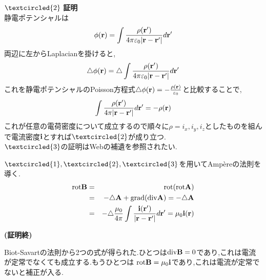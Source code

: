\documentclass{jsarticle}
\begin{document}
$\textcircled{\scriptsize2}$ {\bf 証明} \\
静電ポテンシャルは
\begin{eqnarray*}
\phi ({\bf r})= \int \frac{\rho({\bf r'})}{4 \pi \varepsilon_0 |{\bf r}-{\bf r'}|}d{\bf r'}
\end{eqnarray*}
両辺に左からLaplacianを掛けると,
\begin{eqnarray*}
\triangle \phi ({\bf r})= \triangle \int \frac{\rho({\bf r'})}{4 \pi \varepsilon_0 |{\bf r}-{\bf r'}|}d{\bf r'}
\end{eqnarray*}
これを静電ポテンシャルのPoisson方程式$\triangle \phi({\bf r}) = - \frac{\rho({\bf r})}{\varepsilon_0}$と比較することで,
\begin{eqnarray*}
\int \frac{\rho({\bf r'})}{4 \pi |{\bf r}-{\bf r'}|}d{\bf r'}= - \rho ({\bf r})
\end{eqnarray*}
これが任意の電荷密度について成立するので順々に$\rho=i_x,i_y,i_z$としたものを組んで電流密度${\bf i}$とすれば$\textcircled{\scriptsize2}$が成り立つ. \\
$\textcircled{\scriptsize 3}$の証明はWebの補遺を参照されたい.

$\textcircled{\scriptsize 1},\textcircled{\scriptsize 2},\textcircled{\scriptsize 3}$を用いてAmp\`ereの法則を導く. \\

\begin{eqnarray*}
{\rm rot}{\bf B}&=&{\rm rot}({\rm rot}{\bf A}) \\
&=&- \triangle {\bf A}+{\rm grad}({\rm div}{\bf A}) = - \triangle {\bf A} \\
&=&- \triangle \frac{\mu_0}{4 \pi} \int \frac{{\bf i}({\bf r'})}{|{\bf r}-{\bf r'}|} d{\bf r'} = \mu_0 {\bf i}({\bf r})
\end{eqnarray*}
\begin{flushright}
{\bf (証明終)}
\end{flushright}
Biot-Savartの法則から2つの式が得られた.ひとつは${\rm div}{\bf B}=0$であり,これは電流が定常でなくても成立する.もうひとつは
${\rm rot}{\bf B}=\mu_0{\bf i}$であり,これは電流が定常でないと補正が入る.
\end{document}
